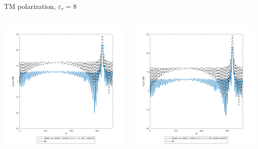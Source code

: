 \begin{frame}{TM polarization, $\varepsilon_r=8$}
\begin{columns}

\includegraphics[width=\linewidth]{results/FF/cylD_01_H_1_M_025_Z/epr8_TM.png}


\includegraphics[width=\linewidth]{results/FF/cylD_01_H_1_M_025_RANDOM/epr8_TM.png}


\end{columns}
\end{frame}
